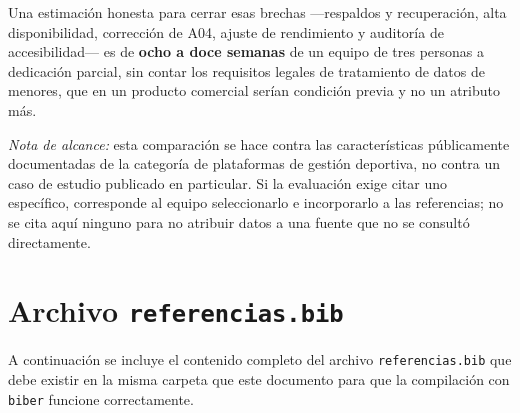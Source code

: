 \documentclass[12pt,a4paper]{article}
\begin{document}
Una estimación honesta para cerrar esas brechas ---respaldos y recuperación, alta disponibilidad,
corrección de A04, ajuste de rendimiento y auditoría de accesibilidad--- es de
\textbf{ocho a doce semanas} de un equipo de tres personas a dedicación parcial, sin contar los
requisitos legales de tratamiento de datos de menores, que en un producto comercial serían
condición previa y no un atributo más.

\textit{Nota de alcance:} esta comparación se hace contra las características públicamente
documentadas de la categoría de plataformas de gestión deportiva, no contra un caso de estudio
publicado en particular. Si la evaluación exige citar uno específico, corresponde al equipo
seleccionarlo e incorporarlo a las referencias; no se cita aquí ninguno para no atribuir datos a
una fuente que no se consultó directamente.

\section{Archivo \texttt{referencias.bib}}
\label{apx:bib}

A continuación se incluye el contenido completo del archivo \texttt{referencias.bib}
que debe existir en la misma carpeta que este documento para que la compilación con
\texttt{biber} funcione correctamente.
\end{document}
